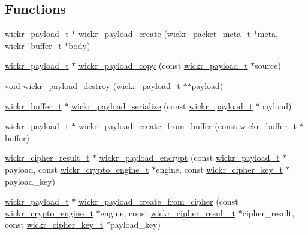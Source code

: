 \subsection*{Functions}
\begin{DoxyCompactItemize}
\item 
\mbox{\hyperlink{structwickr__payload}{wickr\+\_\+payload\+\_\+t}} $\ast$ \mbox{\hyperlink{group__wickr__payload_gad7d51d39a8477d87557536ff42399186}{wickr\+\_\+payload\+\_\+create}} (\mbox{\hyperlink{structwickr__packet__meta}{wickr\+\_\+packet\+\_\+meta\+\_\+t}} $\ast$meta, \mbox{\hyperlink{structwickr__buffer}{wickr\+\_\+buffer\+\_\+t}} $\ast$body)
\item 
\mbox{\hyperlink{structwickr__payload}{wickr\+\_\+payload\+\_\+t}} $\ast$ \mbox{\hyperlink{group__wickr__payload_ga96e1b0eabf307d112985946cbe2f6969}{wickr\+\_\+payload\+\_\+copy}} (const \mbox{\hyperlink{structwickr__payload}{wickr\+\_\+payload\+\_\+t}} $\ast$source)
\item 
void \mbox{\hyperlink{group__wickr__payload_ga821c48aa748408e47ba2149e1628a487}{wickr\+\_\+payload\+\_\+destroy}} (\mbox{\hyperlink{structwickr__payload}{wickr\+\_\+payload\+\_\+t}} $\ast$$\ast$payload)
\item 
\mbox{\hyperlink{structwickr__buffer}{wickr\+\_\+buffer\+\_\+t}} $\ast$ \mbox{\hyperlink{group__wickr__payload_ga047613f464b15c627602399cd0c70c48}{wickr\+\_\+payload\+\_\+serialize}} (const \mbox{\hyperlink{structwickr__payload}{wickr\+\_\+payload\+\_\+t}} $\ast$payload)
\item 
\mbox{\hyperlink{structwickr__payload}{wickr\+\_\+payload\+\_\+t}} $\ast$ \mbox{\hyperlink{group__wickr__payload_ga0965051bd564c60fa3f890185e271a2d}{wickr\+\_\+payload\+\_\+create\+\_\+from\+\_\+buffer}} (const \mbox{\hyperlink{structwickr__buffer}{wickr\+\_\+buffer\+\_\+t}} $\ast$buffer)
\item 
\mbox{\hyperlink{structwickr__cipher__result}{wickr\+\_\+cipher\+\_\+result\+\_\+t}} $\ast$ \mbox{\hyperlink{group__wickr__payload_ga7e4fd2ad4de22c2f7d6160400d2e15e7}{wickr\+\_\+payload\+\_\+encrypt}} (const \mbox{\hyperlink{structwickr__payload}{wickr\+\_\+payload\+\_\+t}} $\ast$payload, const \mbox{\hyperlink{structwickr__crypto__engine}{wickr\+\_\+crypto\+\_\+engine\+\_\+t}} $\ast$engine, const \mbox{\hyperlink{structwickr__cipher__key}{wickr\+\_\+cipher\+\_\+key\+\_\+t}} $\ast$payload\+\_\+key)
\item 
\mbox{\hyperlink{structwickr__payload}{wickr\+\_\+payload\+\_\+t}} $\ast$ \mbox{\hyperlink{group__wickr__payload_gaeeebf95ba580b92254a91009245028ee}{wickr\+\_\+payload\+\_\+create\+\_\+from\+\_\+cipher}} (const \mbox{\hyperlink{structwickr__crypto__engine}{wickr\+\_\+crypto\+\_\+engine\+\_\+t}} $\ast$engine, const \mbox{\hyperlink{structwickr__cipher__result}{wickr\+\_\+cipher\+\_\+result\+\_\+t}} $\ast$cipher\+\_\+result, const \mbox{\hyperlink{structwickr__cipher__key}{wickr\+\_\+cipher\+\_\+key\+\_\+t}} $\ast$payload\+\_\+key)
\end{DoxyCompactItemize}


